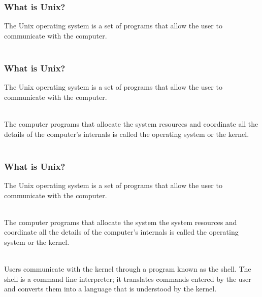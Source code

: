 \documentclass{if-beamer}
\begin{document}
\begin{frame}
\frametitle{What is Unix?}
The Unix operating system is a set of programs that allow the user to communicate with the computer. \\~\

\end{frame}

\begin{frame}
\frametitle{What is Unix?}
The Unix operating system is a set of programs that allow the user to communicate with the computer. \\~\

The computer programs that allocate the system resources and coordinate all the details of the computer's internals is called the operating system or the kernel. \\~\
\end{frame}

\begin{frame}
\frametitle{What is Unix?}
The Unix operating system is a set of programs that allow the user to communicate with the computer. \\~\

The computer programs that allocate the system the system resources and coordinate all the details of the computer's internals is called the operating system or the kernel. \\~\

Users communicate with the kernel through a program known as the shell. The shell is a command line interpreter; it translates commands entered by the user and converts them into a language that is understood by the kernel. \\~\
\end{frame}
\end{document}

